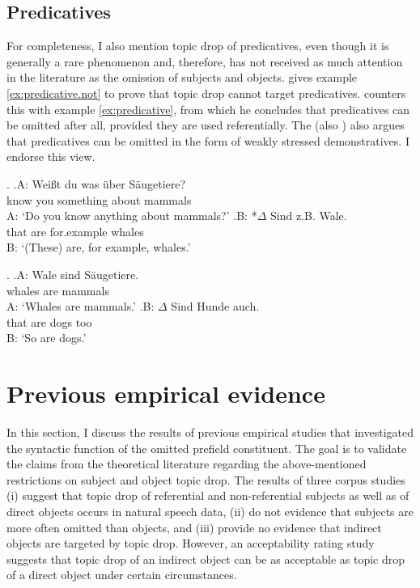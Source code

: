\subsection{Predicatives}
For completeness, I also mention topic drop of predicatives, even though it is generally a rare phenomenon and, therefore, 
has not received as much attention in the literature as the omission of subjects and objects.
\citet[406]{sternefeld1985}  gives example \ref{ex:predicative.not} to prove that topic drop cannot target predicatives.
\citet[29]{fries1988} counters this with example \ref{ex:predicative}, from which he concludes that predicatives can be omitted after all, provided they are used referentially.
The \citet[§1378]{duden2016} (also \cite[§35]{duden2022}) also argues that predicatives can be omitted in the form of weakly stressed demonstratives.
I endorse this view.

\ex.\label{ex:predicative.not}
\ag.A: Weißt du was über Säugetiere?\\
{} know you something about mammals\\
A: `Do you know anything about mammals?'
\bg.B: *$\Delta$ Sind z.B. Wale.\\
{} \phantom{*}that are for.example whales\\
B: `(These) are, for example, whales.' \citep[406, his judgment]{sternefeld1985}

\ex.\label{ex:predicative}
\ag.A: Wale sind Säugetiere.\\
{} whales are mammals\\
A: `Whales are mammals.'
\bg.B: $\Delta$ Sind Hunde auch.\\
{} that are dogs too\\
B: `So are dogs.' \citep[29]{fries1988}

\section{Previous empirical evidence}\label{sec:usage.function.studies}
In this section, I discuss the results of previous empirical studies that investigated the syntactic function of the omitted prefield constituent.
The goal is to validate the claims from the theoretical literature regarding the above-mentioned restrictions on subject and object topic drop.
The results of three corpus studies \citep{poitou1993,frick2017,ruppenhofer2018} (i) suggest that topic drop of referential and non-referential subjects as well as of direct objects occurs in natural speech data, (ii) do not evidence that subjects are more often omitted than objects, and (iii) provide no evidence that indirect objects are targeted by topic drop.
However, an acceptability rating study \citep{trutkowski2018} suggests that topic drop of an indirect object can be as acceptable as topic drop of a direct object under certain circumstances.

